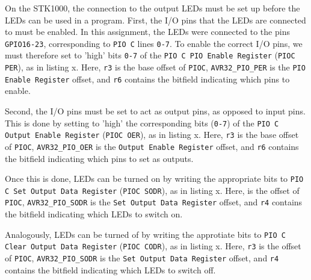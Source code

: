 On the STK1000, the connection to the output LEDs must be set up before the LEDs can be used in a program.
First, the I/O pins that the LEDs are connected to must be enabled.
In this assignment, the LEDs were connected to the pins \texttt{GPIO16-23}, corresponding to \texttt{PIO C} lines \texttt{0-7}.
To enable the correct I/O pins, we must therefore set to 'high' bits \texttt{0-7} of the \texttt{PIO C PIO Enable Register} (\texttt{PIOC PER}), as in listing x.
Here, \texttt{r3} is the base offset of \texttt{PIOC}, \texttt{AVR32\_PIO\_PER} is the \texttt{PIO Enable Register} offset, and \texttt{r6} contains the bitfield indicating which pins to enable.


Second, the I/O pins must be set to act as output pins, as opposed to input pins.
This is done by setting to 'high' the corresponding bits (\texttt{0-7}) of the \texttt{PIO C Output Enable Register} (\texttt{PIOC OER}), as in listing x.
Here, \texttt{r3} is the base offset of \texttt{PIOC}, \texttt{AVR32\_PIO\_OER} is the \texttt{Output Enable Register} offset, and \texttt{r6} contains the bitfield indicating which pins to set as outputs.


Once this is done, LEDs can be turned on by writing the appropriate bits to \texttt{PIO C Set Output Data Register} (\texttt{PIOC SODR}), as in listing x.
Here,  is the offset of \texttt{PIOC}, \texttt{AVR32\_PIO\_SODR} is the \texttt{Set Output Data Register} offset, and \texttt{r4} contains the bitfield indicating which LEDs to switch on.


Analogously, LEDs can be turned of by writing the approtiate bits to \texttt{PIO C Clear Output Data Register} (\texttt{PIOC CODR}), as in listing x. 
Here, \texttt{r3} is the offset of \texttt{PIOC}, \texttt{AVR32\_PIO\_SODR} is the \texttt{Set Output Data Register} offset, and \texttt{r4} contains the bitfield indicating which LEDs to switch off.

